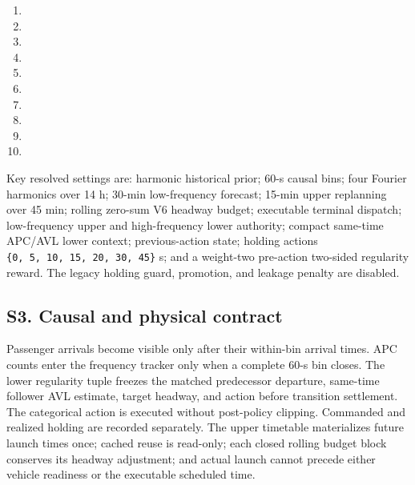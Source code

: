 \documentclass[10pt]{article}
\begin{document}
\begin{enumerate}
\item
\item
\item
\item
\item
\item
\item
\item
\item
\item
\end{enumerate}

Key resolved settings are: harmonic historical prior; 60-s causal bins;
four Fourier harmonics over 14 h; 30-min low-frequency forecast; 15-min
upper replanning over 45 min; rolling zero-sum V6 headway budget;
executable terminal dispatch; low-frequency upper and high-frequency
lower authority; compact same-time APC/AVL lower context;
previous-action state; holding actions
\texttt{\{0,\ 5,\ 10,\ 15,\ 20,\ 30,\ 45\}} s; and a weight-two
pre-action two-sided regularity reward. The legacy holding guard,
promotion, and leakage penalty are disabled.

\subsection{S3. Causal and physical
contract}\label{s3.-causal-and-physical-contract}

Passenger arrivals become visible only after their within-bin arrival
times. APC counts enter the frequency tracker only when a complete 60-s
bin closes. The lower regularity tuple freezes the matched predecessor
departure, same-time follower AVL estimate, target headway, and action
before transition settlement. The categorical action is executed without
post-policy clipping. Commanded and realized holding are recorded
separately. The upper timetable materializes future launch times once;
cached reuse is read-only; each closed rolling budget block conserves
its headway adjustment; and actual launch cannot precede either vehicle
readiness or the executable scheduled time.
\end{document}

